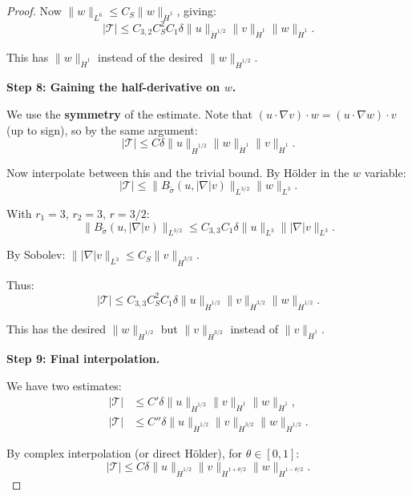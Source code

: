 \documentclass[11pt]{article}
\theoremstyle{definition}
\begin{document}
\begin{proof}
Now $\|w\|_{L^6} \leq C_S \|w\|_{\dot{H}^1}$, giving:
\begin{equation}
|\mathcal{T}| \leq C_{3,2} C_S^2 C_1 \delta \|u\|_{\dot{H}^{1/2}} \|v\|_{\dot{H}^1} \|w\|_{\dot{H}^1}.
\end{equation}

This has $\|w\|_{\dot{H}^1}$ instead of the desired $\|w\|_{\dot{H}^{1/2}}$.

\textbf{Step 8: Gaining the half-derivative on $w$.}

We use the \textbf{symmetry} of the estimate. Note that $(u \cdot \nabla v) \cdot w = (u \cdot \nabla w) \cdot v$ (up to sign), so by the same argument:
\begin{equation}
|\mathcal{T}| \leq C \delta \|u\|_{\dot{H}^{1/2}} \|w\|_{\dot{H}^1} \|v\|_{\dot{H}^1}.
\end{equation}

Now interpolate between this and the trivial bound. By Hölder in the $w$ variable:
\begin{equation}
|\mathcal{T}| \leq \|B_{\tilde{\sigma}}(u, |\nabla|v)\|_{L^{3/2}} \|w\|_{L^3}.
\end{equation}

With $r_1 = 3$, $r_2 = 3$, $r = 3/2$:
\begin{equation}
\|B_{\tilde{\sigma}}(u, |\nabla|v)\|_{L^{3/2}} \leq C_{3,3} C_1 \delta \|u\|_{L^3} \||\nabla|v\|_{L^3}.
\end{equation}

By Sobolev: $\||\nabla|v\|_{L^3} \leq C_S \|v\|_{\dot{H}^{3/2}}$.

Thus:
\begin{equation}\label{eq:T-H32}
|\mathcal{T}| \leq C_{3,3} C_S^2 C_1 \delta \|u\|_{\dot{H}^{1/2}} \|v\|_{\dot{H}^{3/2}} \|w\|_{\dot{H}^{1/2}}.
\end{equation}

This has the desired $\|w\|_{\dot{H}^{1/2}}$ but $\|v\|_{\dot{H}^{3/2}}$ instead of $\|v\|_{\dot{H}^1}$.

\textbf{Step 9: Final interpolation.}

We have two estimates:
\begin{align}
|\mathcal{T}| &\leq C' \delta \|u\|_{\dot{H}^{1/2}} \|v\|_{\dot{H}^1} \|w\|_{\dot{H}^1}, \label{eq:est1}\\
|\mathcal{T}| &\leq C'' \delta \|u\|_{\dot{H}^{1/2}} \|v\|_{\dot{H}^{3/2}} \|w\|_{\dot{H}^{1/2}}. \label{eq:est2}
\end{align}

By complex interpolation (or direct Hölder), for $\theta \in [0,1]$:
\begin{equation}
|\mathcal{T}| \leq C \delta \|u\|_{\dot{H}^{1/2}} \|v\|_{\dot{H}^{1 + \theta/2}} \|w\|_{\dot{H}^{1 - \theta/2}}.
\end{equation}


\end{proof}
\end{document}
